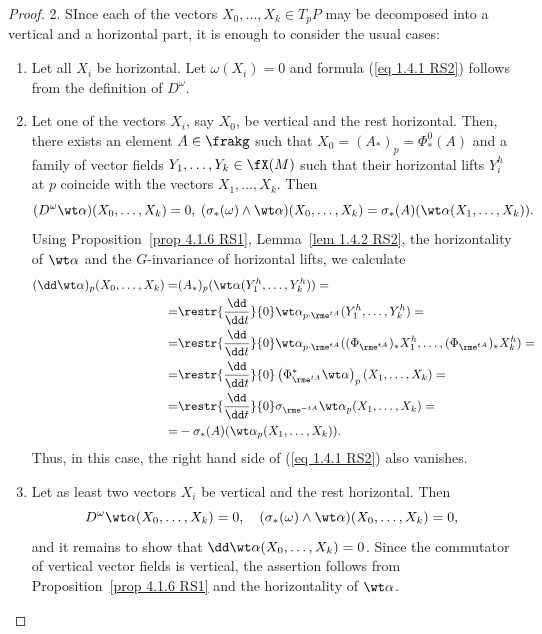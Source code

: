 \begin{proof}
    2. SInce each of the vectors $X_0,\ldots,X_k\in T_pP$ may be decomposed into a vertical and a horizontal part, it is enough to consider the usual cases:
    \begin{enumerate}[label=(\alph*)]
        \item Let all $X_i$ be horizontal. Let $\omega(X_i)=0$ and formula (\ref{eq 1.4.1 RS2}) follows from the definition of $D^\omega$.
        \item Let one of the vectors $X_i$, say $X_0$, be vertical and the rest horizontal. Then, there exists an element $A\in\frakg$ such that $X_0=(A_\ast)_p=\Phi^0_\ast(A)$ and a family of vector fields $Y_1,\ldots,Y_k\in\fX(M)$ such that their horizontal lifts $Y_i^h$ at $p$ coincide with the vectors $X_1,\ldots,X_k$. Then
        \[(D^\omega\wt\alpha)(X_0,\ldots,X_k)=0,\; (\sigma_\ast(\omega)\wedge\wt\alpha)(X_0,\ldots,X_k)=\sigma_\ast(A)(\wt\alpha(X_1,\ldots,X_k)).\]
        Using Proposition~\ref{prop 4.1.6 RS1}, Lemma~\ref{lem 1.4.2 RS2}, the horizontality of $\wt\alpha$ and the $G$-invariance of horizontal lifts, we calculate
        \begin{align}
            (\dd\wt\alpha)_p(X_0,\ldots,X_k)=&(A_\ast)_p(\wt\alpha(Y_1^h,\ldots,Y_k^h))=\\
            =&\restr{\frac{\dd}{\dd t}}{0}\wt\alpha_{p\cdot \rme^{tA}}(Y_1^h,\ldots,Y_k^h)=\\
            =&\restr{\frac{\dd}{\dd t}}{0}\wt\alpha_{p\cdot \rme^{tA}}((\Phi_{\rme^{tA}})_\ast X_1^h,\ldots,(\Phi_{\rme^{tA}})_\ast X_k^h)=\\
            =&\restr{\frac{\dd}{\dd t}}{0}\left(\Phi_{\rme^{tA}}^\ast\wt\alpha\right)_p(X_1,\ldots,X_k)=\\
            =&\restr{\frac{\dd}{\dd t}}{0}\sigma_{\rme^{-tA}}\wt\alpha_p(X_1,\ldots,X_k)=\\
            =&-\sigma_\ast(A)(\wt\alpha_p(X_1,\ldots,X_k)).
        \end{align}
        Thus, in this case, the right hand side of (\ref{eq 1.4.1 RS2}) also vanishes.
        \item Let as least two vectors $X_i$ be vertical and the rest horizontal. Then
        \[D^\omega\wt\alpha(X_0,\ldots,X_k)=0,\quad (\sigma_\ast(\omega)\wedge \wt\alpha)(X_0,\ldots,X_k)=0,\]
        and it remains to show that $\dd\wt\alpha(X_0,\ldots,X_k)=0$. Since the commutator of vertical vector fields is vertical, the assertion follows from Proposition~\ref{prop 4.1.6 RS1} and the horizontality of $\wt\alpha$.
    \end{enumerate}
\end{proof}


